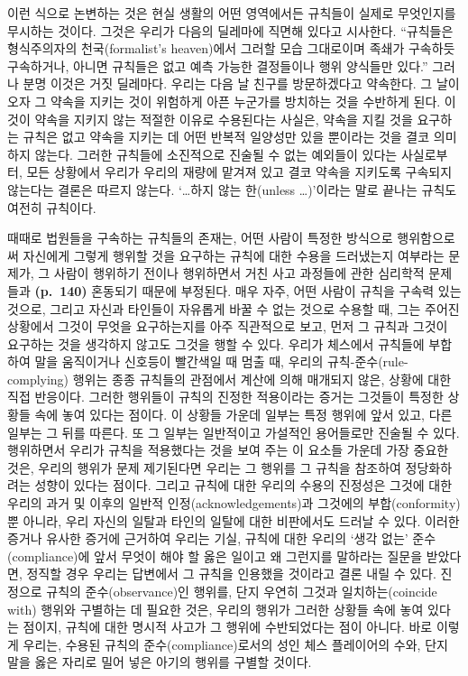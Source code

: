 이런 식으로 논변하는 것은 현실 생활의 어떤 영역에서든 규칙들이 실제로
무엇인지를 무시하는 것이다. 그것은 우리가 다음의 딜레마에 직면해 있다고
시사한다. “규칙들은 형식주의자의 천국(formalist's heaven)에서 그러할
모습 그대로이며 족쇄가 구속하듯 구속하거나, 아니면 규칙들은 없고 예측
가능한 결정들이나 행위 양식들만 있다.” 그러나 분명 이것은 거짓
딜레마다. 우리는 다음 날 친구를 방문하겠다고 약속한다. 그 날이 오자 그
약속을 지키는 것이 위험하게 아픈 누군가를 방치하는 것을 수반하게 된다.
이것이 약속을 지키지 않는 적절한 이유로 수용된다는 사실은, 약속을 지킬
것을 요구하는 규칙은 없고 약속을 지키는 데 어떤 반복적 일양성만 있을
뿐이라는 것을 결코 의미하지 않는다. 그러한 규칙들에 소진적으로 진술될 수
없는 예외들이 있다는 사실로부터, 모든 상황에서 우리가 우리의 재량에
맡겨져 있고 결코 약속을 지키도록 구속되지 않는다는 결론은 따르지 않는다.
‘\ldots 하지 않는 한(unless \ldots)’이라는 말로 끝나는 규칙도 여전히
규칙이다.

때때로 법원들을 구속하는 규칙들의 존재는, 어떤 사람이 특정한 방식으로
행위함으로써 자신에게 그렇게 행위할 것을 요구하는 규칙에 대한 수용을
드러냈는지 여부라는 문제가, 그 사람이 행위하기 전이나 행위하면서 거친
사고 과정들에 관한 심리학적 문제들과 \textbf{(p.~140)} 혼동되기 때문에
부정된다. 매우 자주, 어떤 사람이 규칙을 구속력 있는 것으로, 그리고
자신과 타인들이 자유롭게 바꿀 수 없는 것으로 수용할 때, 그는 주어진
상황에서 그것이 무엇을 요구하는지를 아주 직관적으로 보고, 먼저 그 규칙과
그것이 요구하는 것을 생각하지 않고도 그것을 행할 수 있다. 우리가
체스에서 규칙들에 부합하여 말을 움직이거나 신호등이 빨간색일 때 멈출 때,
우리의 규칙-준수(rule-complying) 행위는 종종 규칙들의 관점에서 계산에
의해 매개되지 않은, 상황에 대한 직접 반응이다. 그러한 행위들이 규칙의
진정한 적용이라는 증거는 그것들이 특정한 상황들 속에 놓여 있다는 점이다.
이 상황들 가운데 일부는 특정 행위에 앞서 있고, 다른 일부는 그 뒤를
따른다. 또 그 일부는 일반적이고 가설적인 용어들로만 진술될 수 있다.
행위하면서 우리가 규칙을 적용했다는 것을 보여 주는 이 요소들 가운데 가장
중요한 것은,  우리의 행위가 문제 제기된다면 우리는 그
행위를 그 규칙을 참조하여 정당화하려는 성향이 있다는 점이다. 그리고
규칙에 대한 우리의 수용의 진정성은 그것에 대한 우리의 과거 및 이후의
일반적 인정(acknowledgements)과 그것에의 부합(conformity)뿐 아니라, 우리
자신의 일탈과 타인의 일탈에 대한 비판에서도 드러날 수 있다. 이러한
증거나 유사한 증거에 근거하여 우리는 기실, 규칙에 대한 우리의 ‘생각
없는’ 준수(compliance)에 앞서 무엇이 해야 할 옳은 일이고 왜 그런지를
말하라는 질문을 받았다면, 정직할 경우 우리는 답변에서 그 규칙을 인용했을
것이라고 결론 내릴 수 있다. 진정으로 규칙의 준수(observance)인 행위를,
단지 우연히 그것과 일치하는(coincide with) 행위와 구별하는 데 필요한
것은, 우리의 행위가 그러한 상황들 속에 놓여 있다는 점이지, 규칙에 대한
명시적 사고가 그 행위에 수반되었다는 점이 아니다. 바로 이렇게 우리는,
수용된 규칙의 준수(compliance)로서의 성인 체스 플레이어의 수와, 단지
말을 옳은 자리로 밀어 넣은 아기의 행위를 구별할 것이다.

